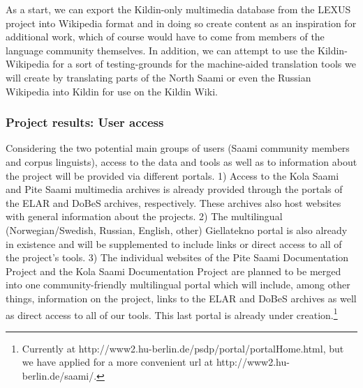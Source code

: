 \documentclass[a4paper,12pt]{article}
\begin{document}
As a start, we can export the Kildin-only multimedia database from the LEXUS project into Wikipedia format and in doing so create content as an inspiration for additional work, which of course would have to come from members of the language community themselves. In addition, we can attempt to use the Kildin-Wikipedia for a sort of testing-grounds for the machine-aided translation tools we will create by translating parts of the North Saami or even the Russian Wikipedia into Kildin for use on the Kildin Wiki.


\subsubsection{Project results: User access}\label{projectResult3}
Considering the two potential main groups of users (Saami community members and corpus linguists), access to the data and tools as well as to information about the project will be provided via different portals. 1) Access to the Kola Saami and Pite Saami multimedia archives is already provided through the portals of the ELAR and DoBeS archives, respectively. These archives also host websites with general information about the projects. 2) The multilingual (Norwegian/Swedish, Russian, English, other) Giellatekno portal is also already in existence and will be supplemented to include links or direct access to all of the project's tools. 3) The individual websites of the Pite Saami Documentation Project and the Kola Saami Documentation Project are planned to be merged into one community-friendly multilingual portal which will include, among other things, information on the project, links to the ELAR and DoBeS archives as well as direct access to all of our tools. This last portal is already under creation.\footnote{Currently at http://www2.hu-berlin.de/psdp/portal/portalHome.html, but we have applied for a more convenient url at http://www2.hu-berlin.de/saami/.}
\end{document}
